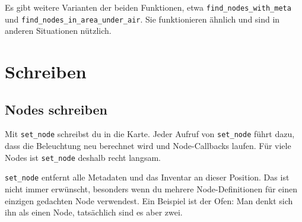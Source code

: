 Es gibt weitere Varianten der beiden Funktionen, etwa
\texttt{find\_\allowbreak{}nodes\_\allowbreak{}with\_\allowbreak{}meta}
und
\texttt{find\_\allowbreak{}nodes\_\allowbreak{}in\_\allowbreak{}area\_\allowbreak{}under\_\allowbreak{}air}.
Sie funktionieren ähnlich und sind in anderen Situationen nützlich.

\section{Schreiben}\label{schreiben}

\subsection{Nodes schreiben}\label{nodes-schreiben}

Mit \texttt{set\_\allowbreak{}node} schreibst du in die Karte. Jeder
Aufruf von \texttt{set\_\allowbreak{}node} führt dazu, dass die
Beleuchtung neu berechnet wird und Node-Callbacks laufen. Für viele
Nodes ist \texttt{set\_\allowbreak{}node} deshalb recht langsam.

\begin{Shaded}
\begin{Highlighting}[]
\OperatorTok{(}
    \OperatorTok{\{}  \OperatorTok{=} \OperatorTok{,}  \OperatorTok{=} \OperatorTok{,}  \OperatorTok{=}  \OperatorTok{\},}
    \OperatorTok{\{}  \OperatorTok{=}  \OperatorTok{\}}
\OperatorTok{)}

  \OperatorTok{=} \OperatorTok{(\{}  \OperatorTok{=} \OperatorTok{,}  \OperatorTok{=} \OperatorTok{,}  \OperatorTok{=}  \OperatorTok{\})}
\OperatorTok{(}\OperatorTok{)} 
\end{Highlighting}
\end{Shaded}

\texttt{set\_\allowbreak{}node} entfernt alle
Metadaten und das
Inventar an dieser Position. Das ist nicht
immer erwünscht, besonders wenn du mehrere Node-Definitionen für einen
einzigen gedachten Node verwendest. Ein Beispiel ist der Ofen: Man denkt
sich ihn als einen Node, tatsächlich sind es aber zwei.


